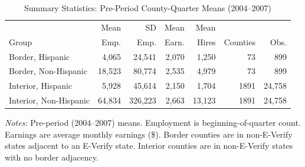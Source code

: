 \begin{table}[H]
\centering
\caption{Summary Statistics: Pre-Period County-Quarter Means (2004--2007)}
\label{tab:summary}
\begin{threeparttable}
\begin{tabular}{lrrrrrr}
\toprule
 & Mean & SD & Mean & Mean & & \\
Group & Emp. & Emp. & Earn. & Hires & Counties & Obs. \\
\midrule
Border, Hispanic & 4,065 & 24,541 & 2,070 & 1,250 & 73 & 899 \\
Border, Non-Hispanic & 18,523 & 80,774 & 2,535 & 4,979 & 73 & 899 \\
Interior, Hispanic & 5,928 & 45,614 & 2,150 & 1,704 & 1891 & 24,758 \\
Interior, Non-Hispanic & 64,834 & 326,223 & 2,663 & 13,123 & 1891 & 24,758 \\
\bottomrule
\end{tabular}
\begin{tablenotes}[flushleft]
\small
\item \textit{Notes:} Pre-period (2004--2007) means. Employment is beginning-of-quarter count. Earnings are average monthly earnings (\$). Border counties are in non-E-Verify states adjacent to an E-Verify state. Interior counties are in non-E-Verify states with no border adjacency.
\end{tablenotes}
\end{threeparttable}
\end{table}
